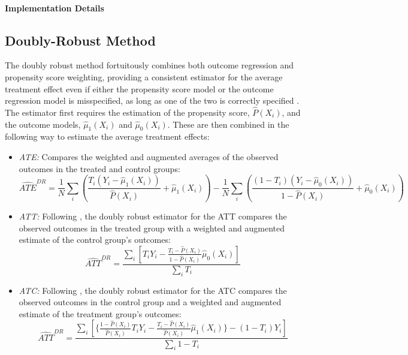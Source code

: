 \documentclass[11pt]{article}
\newcommand{\todo}[1]{{\color{orange}{TODO: #1}}}
\newcommand{\gur}[1]{{\color{teal}{Gur: #1}}}
\begin{document}
\paragraph{Implementation Details} \todo{}

\gur{Add ROC curve of several binary classification models, argue that we do that because the guarantees only work if the propensity is exact.}


\subsection{Doubly-Robust Method}

The doubly robust method fortuitously combines both outcome regression and propensity score weighting, providing a consistent estimator for the average treatment effect even if either the propensity score model or the outcome regression model is misspecified, as long as one of the two is correctly specified \citep{bang2005doubly}. The estimator first requires the estimation of the propensity score, $\hat{P}(X_i)$, and the outcome models, $\hat{\mu}_1(X_i)$ and $\hat{\mu}_0(X_i)$. These are then combined in the following way to estimate the average treatment effects:

\gur{Add explanation of augmentation?}

\gur{small letters?}

\gur{remove superscript DR?}

\gur{cite }

\begin{itemize}
    \item \textit{ATE:} Compares the weighted and augmented averages of the observed outcomes in the treated and control groups:
    \[
    \widehat{ATE}^{DR} = \frac{1}{N} \sum_i \left( \frac{T_i (Y_i - \hat{\mu}_1(X_i))}{\hat{P}(X_i)} + \hat{\mu}_1(X_i) \right) - \frac{1}{N} \sum_i \left( \frac{(1 - T_i)(Y_i - \hat{\mu}_0(X_i))}{1 - \hat{P}(X_i)} + \hat{\mu}_0(X_i) \right)
    \]
    
    \item \textit{ATT:} Following \citet{tao2019doubly}, the doubly robust estimator for the ATT compares the observed outcomes in the treated group with a weighted and augmented estimate of the control group's outcomes: 
    \[
    \widehat{ATT}^{DR} = \frac{\sum_i \left[ T_i Y_i - \frac{ T_i - \hat{P}(X_i)}{1 - \hat{P}(X_i)} \hat{\mu}_0(X_i) \right]}{\sum_i T_i}
    \]
    
    \item \textit{ATC:} Following \citet{tao2019doubly}, the doubly robust estimator for the ATC compares the observed outcomes in the control group and a weighted and augmented estimate of the treatment group's outcomes:
    \[
    \widehat{ATT}^{DR} = \frac{\sum_i \left[ \{ \frac{ 1 - \hat{P}(X_i)}{\hat{P}(X_i)} T_i Y_i - \frac{ T_i - \hat{P}(X_i)}{\hat{P}(X_i)} \hat{\mu}_1(X_i) \}   - (1-T_i)Y_i \right]}{\sum_i 1 - T_i}
    \]
\end{itemize}
\end{document}
